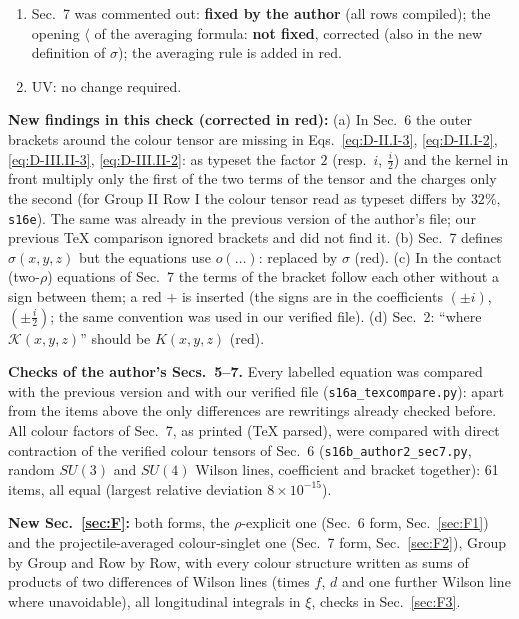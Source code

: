 \documentclass[9pt]{article}
\numberwithin{equation}{section}
\begin{document}
{\begin{enumerate}
\item Sec.~7 was commented out: \textbf{fixed by the author} (all rows compiled); the opening $\langle$ of the averaging formula: \textbf{not fixed}, corrected (also in the new definition of $\sigma$); the averaging rule is added in red.
\item UV: no change required.
\end{enumerate}
\noindent\textbf{New findings in this check (corrected in red):} (a) In Sec.~6 the outer brackets around the colour tensor are missing in Eqs.~\eqref{eq:D-II.I-3}, \eqref{eq:D-II.I-2}, \eqref{eq:D-III.II-3}, \eqref{eq:D-III.II-2}: as typeset the factor $2$ (resp.\ $i$, $\frac{i}{2}$) and the kernel in front multiply only the first of the two terms of the tensor and the charges only the second (for Group II Row I the colour tensor read as typeset differs by $32\%$, \texttt{s16e}). The same was already in the previous version of the author's file; our previous TeX comparison ignored brackets and did not find it. (b) Sec.~7 defines $\sigma(x,y,z)$ but the equations use $o(\dots)$: replaced by $\sigma$ (red). (c) In the contact (two-$\rho$) equations of Sec.~7 the terms of the bracket follow each other without a sign between them; a red $+$ is inserted (the signs are in the coefficients $(\pm i)$, $(\pm\frac{i}{2})$; the same convention was used in our verified file). (d) Sec.~2: ``where $\mathcal{K}(x,y,z)$'' should be $K(x,y,z)$ (red).

\noindent\textbf{Checks of the author's Secs.~5--7.} Every labelled equation was compared with the previous version and with our verified file (\texttt{s16a\_texcompare.py}): apart from the items above the only differences are rewritings already checked before. All colour factors of Sec.~7, as printed (TeX parsed), were compared with direct contraction of the verified colour tensors of Sec.~6 (\texttt{s16b\_author2\_sec7.py}, random $SU(3)$ and $SU(4)$ Wilson lines, coefficient and bracket together): 61 items, all equal (largest relative deviation $8\times10^{-15}$).

\noindent\textbf{New Sec.~\ref{sec:F}:} both forms, the $\rho$-explicit one (Sec.~6 form, Sec.~\ref{sec:F1}) and the projectile-averaged colour-singlet one (Sec.~7 form, Sec.~\ref{sec:F2}), Group by Group and Row by Row, with every colour structure written as sums of products of two differences of Wilson lines (times $f$, $d$ and one further Wilson line where unavoidable), all longitudinal integrals in $\xi$, checks in Sec.~\ref{sec:F3}.
}
\end{document}
